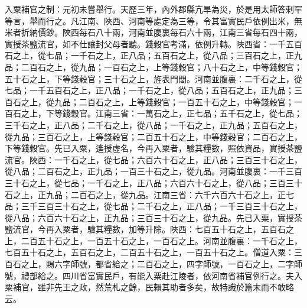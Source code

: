 \begin{pinyinscope}
 入粟補官之制：元初未嘗舉行。天歷三年，內外郡縣亢旱為災，於是用太師答剌罕等言，舉而行之。凡江南、陜西、河南等處定為三等，令其富實民戶依例出米，無米者折納價鈔。陜西每石八十兩，河南並腹裏每石六十兩，江南三省每石四十兩，實授茶鹽流官，如不仕讓封父母者聽。錢穀官考滿，依例升轉。陜西省：一千五百石之上，從七品；一千石之上，正八品；五百石之上，從八品；三百石之上，正九品；二百石之上，從九品；一百石之上，上等錢穀官；八十石之上，中等錢穀官；五十石之上，下等錢穀官；三十石之上，旌表門閭。河南並腹裏：二千石之上，從七品；一千五百石之上，正八品；一千石之上，從八品；五百石之上，正九品；三百石之上，從九品；二百石之上，上等錢穀官；一百五十石之上，中等錢穀官；一百石之上，下等錢穀官。江南三省：一萬石之上，正七品；五千石之上，從七品；三千石之上，正八品；二千石之上，從八品；一千石之上，正九品；五百石之上，從九品；三百石之上，上等錢穀官；二百五十石之上，中等錢穀官；二百石之上，下等錢穀官。先已入粟，遙授虛名，今再入粟者，驗其糧數，照依資品，實授茶鹽流官。陜西：一千石之上，從七品；六百六十石之上，正八品；三百三十石之上，從八品；二百石之上，正九品；一百三十石之上，從九品。河南並腹裏：一千三百三十石之上，從七品；一千石之上，正八品；六百六十石之上，從八品；三百三十石之上，正九品；二百石之上，從九品。江南三省：六千六百六十石之上，正七品；三千三百三十石之上，從七品；二千石之上，正八品；一千三百三十石之上，從八品；六百六十石之上，正九品；三百三十石之上，從九品。先已入粟，實授茶鹽流官，今再入粟者，驗其糧數，加等升除。陜西：七百五十石之上，五百石之上，二百五十石之上，一百五十石之上，一百石之上。河南並腹裏：一千石之上，七百五十石之上，五百石之上，二百五十石之上，一百五十石之上。僧道入粟：三百石之上，賜六字師號，都省給之；二百石之上，四字師號，一百石之上，二字師號，禮部給之。四川省富實民戶，有能入粟赴江陵者，依河南省補官例行之。夫入粟補官，雖非先王之政，然荒札之餘，民賴其助者多矣，故特識於篇末而不敢略云。



\end{pinyinscope}